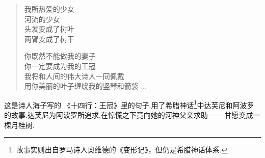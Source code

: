 \documentclass{ctexart}
\begin{document}
\begin{tcolorbox}[colback=gray!20, colframe=blue]
    \begin{quote}
        我所热爱的少女\\
        河流的少女\\
        头发变成了树叶\\
        两臂变成了树干

        你既然不能做我的妻子\\
        你一定要成为我的王冠\\
        我将和人间的伟大诗人一同佩戴\\
        用你美丽的叶子缠绕我的竖琴和箭袋  ...\\
    \end{quote}
\end{tcolorbox}
这是诗人海子写的 《十四行：王冠》里的句子.用了希腊神话\footnote{故事实则出自罗马诗人奥维德的《变形记》，但仍是希腊神话体系.}中达芙尼和阿波罗的故事.达芙尼为阿波罗所追求,在惊慌之下竟向她的河神父亲求助
——甘愿变成一棵月桂树.


\end{document}
